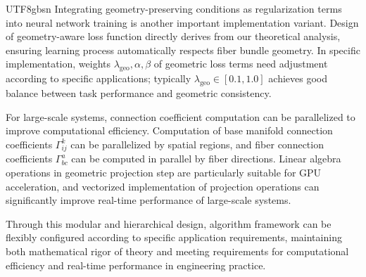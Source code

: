 \documentclass[a4paper,12pt]{extarticle}
\theoremstyle{definition}
\begin{document}
\begin{CJK}{UTF8}{gbsn}
Integrating geometry-preserving conditions as regularization terms into neural network training is another important implementation variant. Design of geometry-aware loss function directly derives from our theoretical analysis, ensuring learning process automatically respects fiber bundle geometry. In specific implementation, weights $\lambda_{\text{geo}}, \alpha, \beta$ of geometric loss terms need adjustment according to specific applications; typically $\lambda_{\text{geo}} \in [0.1, 1.0]$ achieves good balance between task performance and geometric consistency.

For large-scale systems, connection coefficient computation can be parallelized to improve computational efficiency. Computation of base manifold connection coefficients $\Gamma^k_{ij}$ can be parallelized by spatial regions, and fiber connection coefficients $\Gamma^a_{bc}$ can be computed in parallel by fiber directions. Linear algebra operations in geometric projection step are particularly suitable for GPU acceleration, and vectorized implementation of projection operations can significantly improve real-time performance of large-scale systems.

Through this modular and hierarchical design, algorithm framework can be flexibly configured according to specific application requirements, maintaining both mathematical rigor of theory and meeting requirements for computational efficiency and real-time performance in engineering practice.











\end{CJK}
\end{document}
